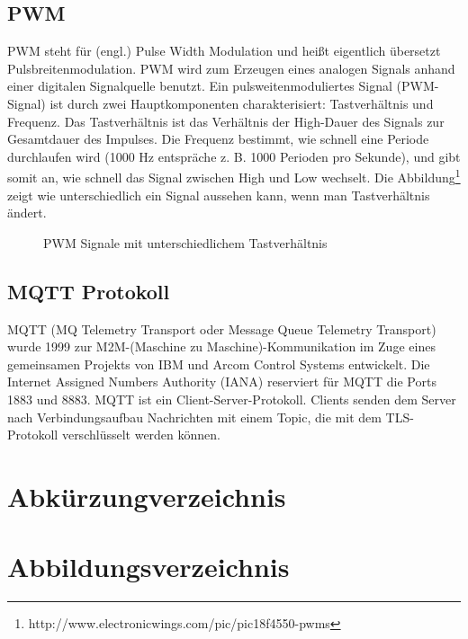 \section{PWM}
PWM steht für (engl.) Pulse Width Modulation und heißt eigentlich übersetzt Pulsbreitenmodulation. PWM wird zum Erzeugen eines analogen Signals anhand einer digitalen Signalquelle benutzt. Ein pulsweitenmoduliertes Signal (PWM-Signal) ist durch zwei Hauptkomponenten charakterisiert: Tastverhältnis und Frequenz. Das Tastverhältnis ist das Verhältnis der High-Dauer des Signals zur Gesamtdauer des Impulses. Die Frequenz bestimmt, wie schnell eine Periode durchlaufen wird (1000 Hz entspräche z. B. 1000 Perioden pro Sekunde), und gibt somit an, wie schnell das Signal zwischen High und Low wechselt. Die Abbildung\footnote{http://www.electronicwings.com/pic/pic18f4550-pwms} zeigt wie unterschiedlich ein Signal aussehen kann, wenn man Tastverhältnis ändert. 
\begin{figure}[!htb]
	\centering
	\caption{PWM Signale mit unterschiedlichem Tastverhältnis}
	\label{fig:pwm}
\end{figure}

\section{MQTT Protokoll}
MQTT (MQ Telemetry Transport oder Message Queue Telemetry Transport) wurde 1999 zur M2M-(Maschine zu Maschine)-Kommunikation im Zuge eines gemeinsamen Projekts von IBM und Arcom Control Systems entwickelt. Die Internet Assigned Numbers Authority (IANA) reserviert für MQTT die Ports 1883 und 8883. MQTT ist ein Client-Server-Protokoll. Clients senden dem Server nach Verbindungsaufbau Nachrichten mit einem Topic, die mit dem TLS-Protokoll verschlüsselt werden können. 

\chapter{Abkürzungverzeichnis}
\label{sec:abkuerz}
\begin{acronym}[SEPSEP]
	
\end{acronym}


\chapter{Abbildungsverzeichnis}
\label{sec:abbild}
\renewcommand{\cftfigpresnum}{Abb. } 
\renewcommand{\listfigurename}{}
\setlength{\cftfignumwidth}{2 cm}
\listoffigures{}%

